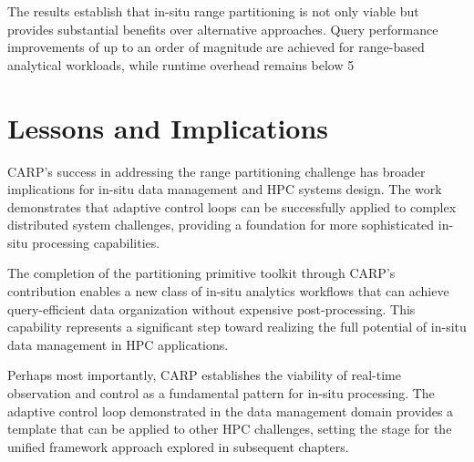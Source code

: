 The results establish that in-situ range partitioning is not only viable but provides substantial
benefits over alternative approaches.
Query performance improvements of up to an order of magnitude are achieved for range-based
analytical workloads, while runtime overhead remains below 5

\section{Lessons
  and Implications}

CARP's success in addressing the range partitioning challenge
has broader implications for in-situ data management and HPC systems design.
The work demonstrates that adaptive control loops can be successfully applied to complex
distributed system challenges, providing a foundation for more sophisticated in-situ processing
capabilities.

The completion of the partitioning primitive toolkit through CARP's contribution enables a new
class of in-situ analytics workflows that can achieve query-efficient data organization without
expensive post-processing.
This capability represents a significant step toward realizing the full potential of in-situ data
management in HPC applications.

Perhaps most importantly, CARP establishes the viability of real-time observation and control as a
fundamental pattern for in-situ processing.
The adaptive control loop demonstrated in the data management domain provides a template that can
be applied to other HPC challenges, setting the stage for the unified framework approach explored
in subsequent chapters.

